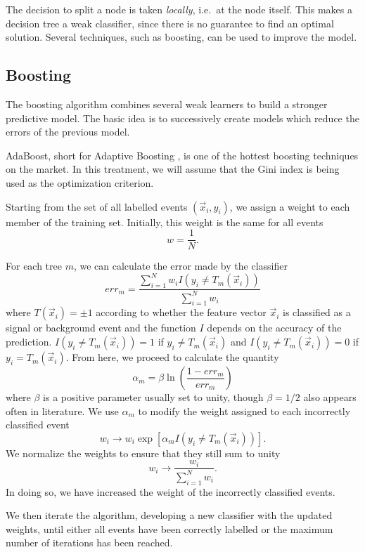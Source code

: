 \documentclass[10pt,a4paper]{book}
\begin{document}
The decision to split a node is taken \emph{locally}, i.e.\ at the node itself. This makes a decision tree a weak classifier, since there is no guarantee to find an optimal solution. Several techniques, such as boosting, can be used to improve the model. 

\subsection{Boosting}
The boosting algorithm combines several weak learners to build a stronger predictive model. The basic idea is to successively create models which reduce the errors of the previous model. 

AdaBoost, short for Adaptive Boosting \cite{Freund1996ExperimentsWA}, is one of the hottest boosting techniques on the market. In this treatment, we will assume that the Gini index is being used as the optimization criterion.

Starting from the set of all labelled events $(\vec{x}_i, y_i)$, we assign a weight to each member of the training set. Initially, this weight is the same for all events
\begin{equation}
w = \frac{1}{N}.
\end{equation}

For each tree $m$, we can calculate the error made by the classifier
\begin{equation}
err_m = \frac{\sum_{i= 1}^N w_i I(y_i \neq T_m(\vec{x}_i))}{\sum_{i =1}^N w_i}
\label{error}
\end{equation}
where $T(\vec{x}_i) = \pm 1$ according to whether the feature vector $\vec{x}_i$ is classified as a signal or background event and the function $I$ depends on the accuracy of the prediction. $I(y_i \neq T_m(\vec{x}_i)) = 1$ if $y_i \neq T_m(\vec{x}_i)$ and $I(y_i \neq T_m(\vec{x}_i)) = 0$ if $y_i = T_m(\vec{x}_i)$.
From here, we proceed to calculate the quantity
\begin{equation}
\alpha_m = \beta \ln \left( \frac{1 - err_m}{err_m} \right)
\end{equation}
where $\beta$ is a positive parameter usually set to unity, though $\beta = 1/2$ also appears often in literature. We use $\alpha_m$ to modify the weight assigned to each incorrectly classified event
\begin{equation}
w_i \rightarrow w_i \exp\left[\alpha_m I(y_i \neq T_m(\vec{x}_i)) \right].
\end{equation}
We normalize the weights to ensure that they still sum to unity
\begin{equation}
w_i \rightarrow \frac{w_i}{\sum_{i=1}^N w_i}.
\end{equation}
In doing so, we have increased the weight of the incorrectly classified events. 

We then iterate the algorithm, developing a new classifier with the updated weights, until either all events have been correctly labelled or the maximum number of iterations has been reached. 
\nocite{Yang2005StudiesOB}
\end{document}
